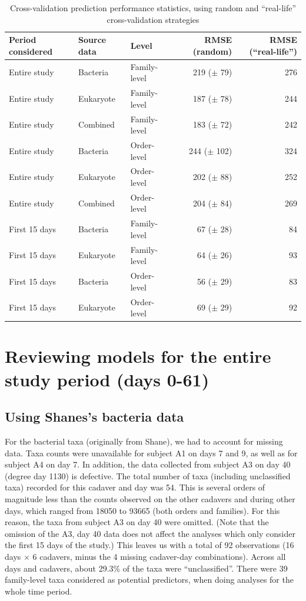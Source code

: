 \documentclass{article}
\begin{document}
\begin{table}
\centering
\caption{\label{tbl:valid_model_stats}Cross-validation prediction
  performance statistics, using random and ``real-life''
  cross-validation strategies}
\begin{tabular}{lllrr}
Period considered & Source data & Level & RMSE (random) & RMSE (``real-life'')\\ \hline \hline
Entire study & Bacteria  & Family-level & 219 ($\pm$ 79)  & 276\\
Entire study & Eukaryote & Family-level & 187 ($\pm$ 78)  & 244\\
Entire study & Combined  & Family-level & 183 ($\pm$ 72)  & 242\\ \hline
Entire study & Bacteria  & Order-level  & 244 ($\pm$ 102) & 324\\
Entire study & Eukaryote & Order-level  & 202 ($\pm$ 88)  & 252\\
Entire study & Combined  & Order-level  & 204 ($\pm$ 84)  & 269\\ \hline
First 15 days & Bacteria  & Family-level & 67 ($\pm$ 28) & 84\\
First 15 days & Eukaryote & Family-level & 64 ($\pm$ 26) & 93\\ \hline
First 15 days & Bacteria  & Order-level  & 56 ($\pm$ 29) & 83\\
First 15 days & Eukaryote & Order-level  & 69 ($\pm$ 29) & 92
\end{tabular}
\end{table}




\section{Reviewing models for the entire study period (days 0-61)}


\subsection{Using Shanes's bacteria data}

For the bacterial taxa (originally from Shane), we had to account for
missing data.  Taxa counts were unavailable for subject A1 on days 7
and 9, as well as for subject A4 on day 7.  In addition, the data
collected from subject A3 on day 40 (degree day 1130) is defective.
The total number of taxa (including unclassified taxa) recorded for
this cadaver and day was 54.  This is several orders of magnitude less
than the counts observed on the other cadavers and during other days,
which ranged from 18050 to 93665 (both orders and families).  For this
reason, the taxa from subject A3 on day 40 were omitted.  (Note that
the omission of the A3, day 40 data does not affect the analyses which
only consider the first 15 days of the study.)  This leaves us with a
total of 92 observations (16 days $\times$ 6 cadavers, minus the 4
missing cadaver-day combinations).  Across all days and cadavers,
about 29.3\% of the taxa were ``unclassified''.  There were 39
family-level taxa considered as potential predictors, when doing
analyses for the whole time period.
\end{document}
